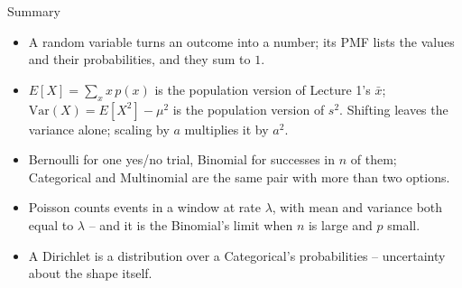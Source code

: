 \begin{frame}{Summary}
\begin{itemize}
  \item A random variable turns an outcome into a number; its PMF lists the values and their probabilities, and they sum to $1$.
  \pause
  \item $E[X] = \sum_x x\,p(x)$ is the population version of Lecture 1's $\bar{x}$; $\mathrm{Var}(X) = E[X^2] - \mu^2$ is the population version of $s^2$. Shifting leaves the variance alone; scaling by $a$ multiplies it by $a^2$.
  \pause
  \item Bernoulli for one yes/no trial, Binomial for successes in $n$ of them; Categorical and Multinomial are the same pair with more than two options.
  \pause
  \item Poisson counts events in a window at rate $\lambda$, with mean and variance both equal to $\lambda$ -- and it is the Binomial's limit when $n$ is large and $p$ small.
  \pause
  \item A Dirichlet is a distribution over a Categorical's probabilities -- uncertainty about the shape itself.
\end{itemize}
\end{frame}
